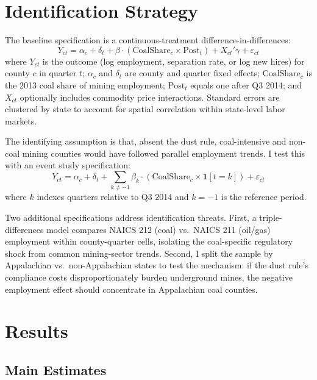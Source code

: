\documentclass[12pt]{article}
\begin{document}



\section{Identification Strategy}
\label{sec:design}

The baseline specification is a continuous-treatment difference-in-differences:
\begin{equation}
\label{eq:main}
Y_{ct} = \alpha_c + \delta_t + \beta \cdot (\text{CoalShare}_c \times \text{Post}_t) + X_{ct}'\gamma + \varepsilon_{ct}
\end{equation}
where $Y_{ct}$ is the outcome (log employment, separation rate, or log new hires) for county $c$ in quarter $t$; $\alpha_c$ and $\delta_t$ are county and quarter fixed effects; $\text{CoalShare}_c$ is the 2013 coal share of mining employment; $\text{Post}_t$ equals one after Q3 2014; and $X_{ct}$ optionally includes commodity price interactions. Standard errors are clustered by state to account for spatial correlation within state-level labor markets.

The identifying assumption is that, absent the dust rule, coal-intensive and non-coal mining counties would have followed parallel employment trends. I test this with an event study specification:
\begin{equation}
\label{eq:es}
Y_{ct} = \alpha_c + \delta_t + \sum_{k \neq -1} \beta_k \cdot (\text{CoalShare}_c \times \mathbf{1}[t = k]) + \varepsilon_{ct}
\end{equation}
where $k$ indexes quarters relative to Q3 2014 and $k = -1$ is the reference period.

Two additional specifications address identification threats. First, a triple-differences model compares NAICS 212 (coal) vs.\ NAICS 211 (oil/gas) employment within county-quarter cells, isolating the coal-specific regulatory shock from common mining-sector trends. Second, I split the sample by Appalachian vs.\ non-Appalachian states to test the mechanism: if the dust rule's compliance costs disproportionately burden underground mines, the negative employment effect should concentrate in Appalachian coal counties.


\section{Results}
\label{sec:results}

\subsection{Main Estimates}
\end{document}
